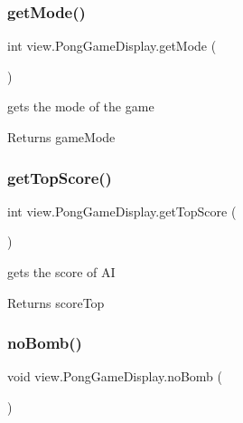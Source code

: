 \subsubsection{\texorpdfstring{get\+Mode()}{getMode()}}
{\footnotesize\ttfamily int view.\+Pong\+Game\+Display.\+get\+Mode (\begin{DoxyParamCaption}{ }\end{DoxyParamCaption})}



gets the mode of the game 

\begin{DoxyReturn}{Returns}
game\+Mode 
\end{DoxyReturn}
\hypertarget{classview_1_1_pong_game_display_a4a5b6bbbf9156076f5e683954b315603}{}\label{classview_1_1_pong_game_display_a4a5b6bbbf9156076f5e683954b315603} 
\subsubsection{\texorpdfstring{get\+Top\+Score()}{getTopScore()}}
{\footnotesize\ttfamily int view.\+Pong\+Game\+Display.\+get\+Top\+Score (\begin{DoxyParamCaption}{ }\end{DoxyParamCaption})}



gets the score of AI 

\begin{DoxyReturn}{Returns}
score\+Top 
\end{DoxyReturn}
\hypertarget{classview_1_1_pong_game_display_a51b69bc0f6f840b4c736049115e0f449}{}\label{classview_1_1_pong_game_display_a51b69bc0f6f840b4c736049115e0f449} 
\subsubsection{\texorpdfstring{no\+Bomb()}{noBomb()}}
{\footnotesize\ttfamily void view.\+Pong\+Game\+Display.\+no\+Bomb (\begin{DoxyParamCaption}{ }\end{DoxyParamCaption})}



